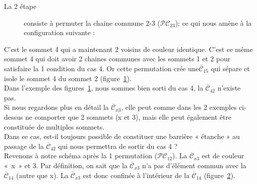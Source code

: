 \documentclass[french]{report}
\begin{document}
\begin{description}
\item[La 2 étape] consiste à permuter la chaine commune 2-3  ($\mathcal{PC}_{23}$); ce qui nous amène à la configuration suivante :\	
\end{description}

\begin{figure}[!ht]\centering
	\begin{changemargin}{0cm}{-3cm}
		\begin{center}
			
			\hspace{15pt}
			
		\end{center}
	\end{changemargin}
	\begin{changemargin}{3cm}{0cm}
	\caption{}\label{fig:cas4_etape2_1}
	\end{changemargin}
\end{figure}	
\FloatBarrier


C’est le sommet 4 qui a maintenant 2 voisins de couleur identique. C’est ce même sommet 4 qui doit avoir 2 chaines communes avec les sommets 1 et 2 pour satisfaire la 1  condition du cas 4.
Or cette permutation crée une$\overline{\mathcal{C}}_{15}$ qui sépare et isole le sommet 4 du sommet 2  (figure~\ref{fig:cas4_etape2_1}).\\
Dans l'exemple des figures~\ref{fig:cas4_etape2_1}, nous sommes bien sorti du cas 4, la $\overline{\mathcal{C}}_{42}$ n'existe pas.\\
Si nous regardons plus en détail la $\overline{\mathcal{C}}_{x3}$, elle peut comme dans les 2 exemples ci-dessus ne comporter que 2 sommets (x et 3), mais elle peut également être constituée de multiples sommets.\\
Dans ce cas, est-il toujours possible de constituer une barrière « étanche » au passage de la $\overline{\mathcal{C}}_{42}$ qui nous permettra de sortir du cas 4 ?\\
Revenons à notre schéma après la 1\up{ere} permutation ($\mathcal{PC}_{12}$).
La $\overline{\mathcal{C}}_{x3}$ est de couleur «~x~» et 3. Par définition, on sait que la $\overline{\mathcal{C}}_{x3}$ n'a pas d’élément commun avec la $\overline{\mathcal{C}}_{14}$ (autre que x). La $\overline{\mathcal{C}}_{x3}$ est donc confinée à l’intérieur de la $\overline{\mathcal{C}}_{14}$ (figure~\ref{fig:cas4_etape2_barrage}).
\begin{figure}[!ht]\centering
	\begin{changemargin}{0cm}{-3cm}
		\begin{center}
			
		\end{center}
	\end{changemargin}
	\begin{changemargin}{3cm}{0cm}
	\caption{}\label{fig:cas4_etape2_barrage}
	\end{changemargin}
\end{figure}	
\FloatBarrier
\end{document}
